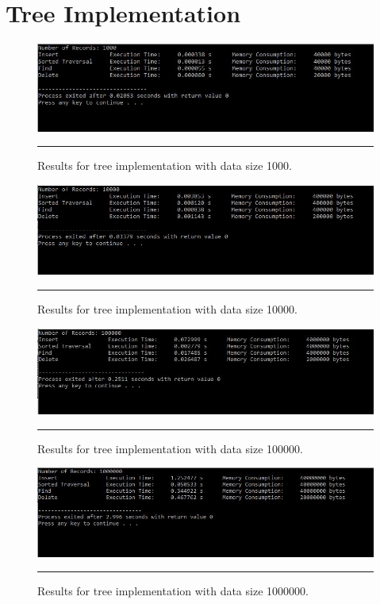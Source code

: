 \chapter{Tree Implementation} %
\label{Chapter6}

\begin{figure}[H]
	\centering
	\includegraphics[scale =0.7]{./Figures/Tree1000.jpg}
	\rule{35em}{0.5pt}
	\caption{Results for tree implementation with data size 1000.}
	\label{fig:Tree 1000}
\end{figure}

\begin{figure}[H]
	\centering
	\includegraphics[scale =0.7]{./Figures/Tree10000.jpg}
	\rule{35em}{0.5pt}
	\caption{Results for tree implementation with data size 10000.}
	\label{fig:Tree 10000}
\end{figure}

\begin{figure}[H]
	\centering
	\includegraphics[scale =0.7]{./Figures/Tree100000.jpg}
	\rule{35em}{0.5pt}
	\caption{Results for tree implementation with data size 100000.}
	\label{fig:Tree 100000}
\end{figure}

\begin{figure}[H]
	\centering
	\includegraphics[scale =0.7]{./Figures/Tree1000000.jpg}
	\rule{35em}{0.5pt}
	\caption{Results for tree implementation with data size 1000000.}
	\label{fig:Tree 1000000}
\end{figure}
